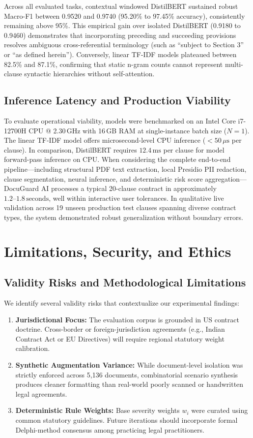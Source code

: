 \documentclass[conference]{IEEEtran}
\begin{document}
Across all evaluated tasks, contextual windowed DistilBERT sustained robust Macro-F1 between 0.9520 and 0.9740 (95.20\% to 97.45\% accuracy), consistently remaining above 95\%. This empirical gain over isolated DistilBERT (0.9180 to 0.9460) demonstrates that incorporating preceding and succeeding provisions resolves ambiguous cross-referential terminology (such as ``subject to Section 3'' or ``as defined herein''). Conversely, linear TF-IDF models plateaued between 82.5\% and 87.1\%, confirming that static n-gram counts cannot represent multi-clause syntactic hierarchies without self-attention.

\subsection{Inference Latency and Production Viability}
To evaluate operational viability, models were benchmarked on an Intel Core i7-12700H CPU @ 2.30\,GHz with 16\,GB RAM at single-instance batch size ($N=1$). The linear TF-IDF model offers microsecond-level CPU inference ($<50\,\mu\text{s}$ per clause). In comparison, DistilBERT requires $12.4\,\text{ms}$ per clause for model forward-pass inference on CPU. When considering the complete end-to-end pipeline---including structural PDF text extraction, local Presidio PII redaction, clause segmentation, neural inference, and deterministic risk score aggregation---DocuGuard AI processes a typical 20-clause contract in approximately $1.2\text{--}1.8\,\text{seconds}$, well within interactive user tolerances. In qualitative live validation across 19 unseen production test clauses spanning diverse contract types, the system demonstrated robust generalization without boundary errors.

\section{Limitations, Security, and Ethics}
\subsection{Validity Risks and Methodological Limitations}
We identify several validity risks that contextualize our experimental findings:
\begin{enumerate}
    \item \textbf{Jurisdictional Focus:} The evaluation corpus is grounded in US contract doctrine. Cross-border or foreign-jurisdiction agreements (e.g., Indian Contract Act or EU Directives) will require regional statutory weight calibration.
    \item \textbf{Synthetic Augmentation Variance:} While document-level isolation was strictly enforced across 5,136 documents, combinatorial scenario synthesis produces cleaner formatting than real-world poorly scanned or handwritten legal agreements.
    \item \textbf{Deterministic Rule Weights:} Base severity weights $w_i$ were curated using common statutory guidelines. Future iterations should incorporate formal Delphi-method consensus among practicing legal practitioners.
\end{enumerate}
\end{document}
